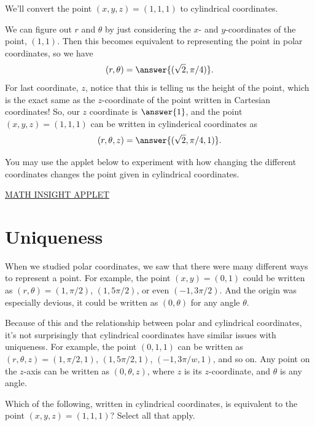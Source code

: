 \documentclass{ximera}
\begin{document}
\begin{example}
We'll convert the point $(x,y,z) = (1,1,1)$ to cylindrical coordinates.

We can figure out $r$ and $\theta$ by just considering the $x$- and $y$-coordinates of the point, $(1,1)$. Then this becomes equivalent to representing the point in polar coordinates, so we have
\[
(r,\theta) = \answer{(\sqrt{2}, \pi/4)}.
\]
For last coordinate, $z$, notice that this is telling us the height of the point, which is the exact same as the $z$-coordinate of the point written in Cartesian coordinates! So, our $z$ coordinate is $\answer{1}$, and the point $(x,y,z) = (1,1,1)$ can be written in cylinderical coordinates as
\[
(r,\theta,z) = \answer{(\sqrt{2}, \pi/4, 1)}.
\]
\end{example}

You may use the applet below to experiment with how changing the different coordinates changes the point given in cylindrical coordinates.

\href{https://mathinsight.org/cylindrical_coordinates}{MATH INSIGHT APPLET}

\section{Uniqueness}

When we studied polar coordinates, we saw that there were many different ways to represent a point. For example, the point $(x,y) = (0,1)$ could be written as $(r,\theta) = (1,\pi/2)$, $(1,5\pi/2)$, or even $(-1,3\pi/2)$. And the origin was especially devious, it could be written as $(0,\theta)$ for any angle $\theta$.

Because of this and the relationship between polar and cylindrical coordinates, it's not surprisingly that cylindrical coordinates have similar issues with uniqueness. For example, the point $(0,1,1)$ can be written as $(r,\theta, z) = (1,\pi/2,1)$, $(1,5\pi/2,1)$, $(-1, 3\pi/w, 1)$, and so on. Any point on the $z$-axis can be written as $(0,\theta,z)$, where $z$ is its $z$-coordinate, and $\theta$ is any angle.

\begin{problem}
Which of the following, written in cylindrical coordinates, is equivalent to the point $(x,y,z) = (1,1,1)$? Select all that apply.
\begin{selectAll}
\end{selectAll}
\end{problem}
\end{document}
